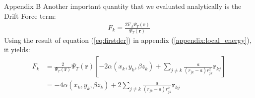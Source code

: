 Appendix B
Another important quantity that we evaluated analytically is the Drift Force term: 
\begin{align*}
    F_k=\frac{2\nabla_k \Psi_T(\mathbf{r})}{\Psi_T(\mathbf{r})}
\end{align*}
Using the result of equation (\ref{eq:firstder}) in appendix (\ref{appendix:local_energy}), it yields: 
\begin{align*}
    F_k &= \frac{2}{\Psi_T(\mathbf{r})}\Psi_T(\mathbf{r}) \left[ -2\alpha (x_k, y_k, \beta z_k) + \sum_{j\neq k} \frac{a}{\left( r_{jk} - a \right) r_{jk}^2} \mathbf{r}_{kj} \right] \\ 
     &=-4\alpha (x_k, y_k, \beta z_k) + 2\sum_{j\neq k} \frac{a}{\left( r_{jk} - a \right) r_{jk}^2} \mathbf{r}_{kj} 
\end{align*}